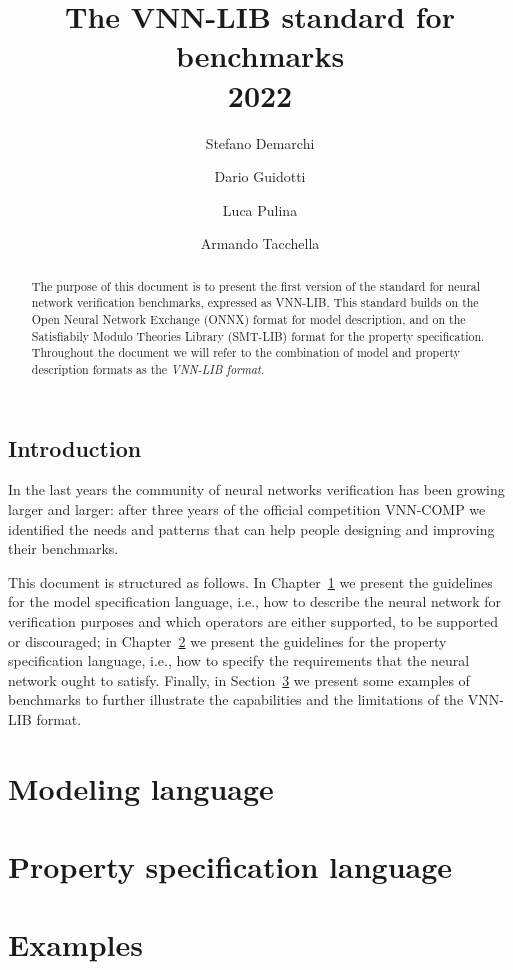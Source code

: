 \documentclass[12pt,a4paper]{report}
\title{The VNN-LIB standard for benchmarks\\2022}
\author[1]{Stefano Demarchi}
\author[2]{Dario Guidotti}
\author[2]{Luca Pulina}
\author[1]{Armando Tacchella}
\affil[1]{University of Genoa, Viale Causa 13, 16145 Genoa, Italy}
\affil[2]{University of Sassari, Via Roma 151, 07100 Sassari, Italy}
\begin{document}
\maketitle

\begin{abstract}
  The purpose of this document is to present the first version of the
  standard for neural network verification benchmarks, expressed as
  VNN-LIB. This standard builds on the Open Neural Network Exchange 
  (ONNX) format for model description, and on the Satisfiabily Modulo
  Theories Library (SMT-LIB) format for the property specification. 
  Throughout the document we will refer to the combination of model 
  and property description formats as the \emph{VNN-LIB format}.
\end{abstract}


\section*{Introduction}

In the last years the community of neural networks verification has
been growing larger and larger: after three years of the official
competition VNN-COMP we identified the needs and patterns that can
help people designing and improving their benchmarks.

This document is structured as follows. In Chapter~\ref{sec:model} we
present the guidelines for the model specification language, i.e., how
to describe the neural network for verification purposes and which 
operators are either supported, to be supported or discouraged; in
Chapter~\ref{sec:property} we present the guidelines for the property
specification language, i.e., how to specify the requirements that the
neural network ought to satisfy. Finally, in Section~\ref{sec:examples} 
we present some examples of benchmarks to further illustrate the
capabilities and the limitations of the VNN-LIB format.

\chapter{Modeling language}
\label{sec:model}


\chapter{Property specification language}
\label{sec:property}


\chapter{Examples}
\label{sec:examples}

\end{document}

